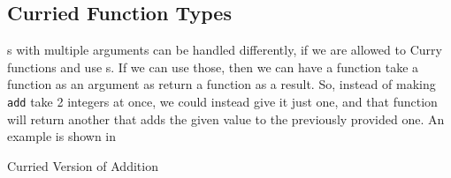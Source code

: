\subsection{Curried Function Types}\label{subsec:Curried_Function_Types}
s with multiple arguments can be handled differently, if we are allowed to Curry functions and use s.
If we can use those, then we can have a function take a function as an argument as return a function as a result.
So, instead of making \texttt{add} take 2 integers at once, we could instead give it just one, and that function will return another that adds the given value to the previously provided one.
An example is shown in 

\begin{listing}[h!tbp]
\caption{Curried Version of Addition}
\label{lst:Curried_Add_Example}
\end{listing}


